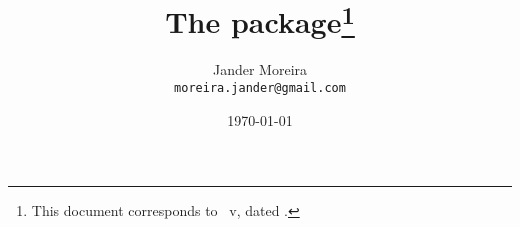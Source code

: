 \documentclass[a4paper, 11pt, twocolumn, landscape]{article}
\title{The \PackageName{algxpar} package\thanks{This document corresponds to \PackageName{algxpar}~v\AlgVersion, dated \AlgDate.}}
\author{Jander Moreira\\\texttt{moreira.jander@gmail.com}}
\date{\today}
\begin{document}
\maketitle
\sloppy

%
%
%
%
%
%
%
%
%
%
\end{document}
